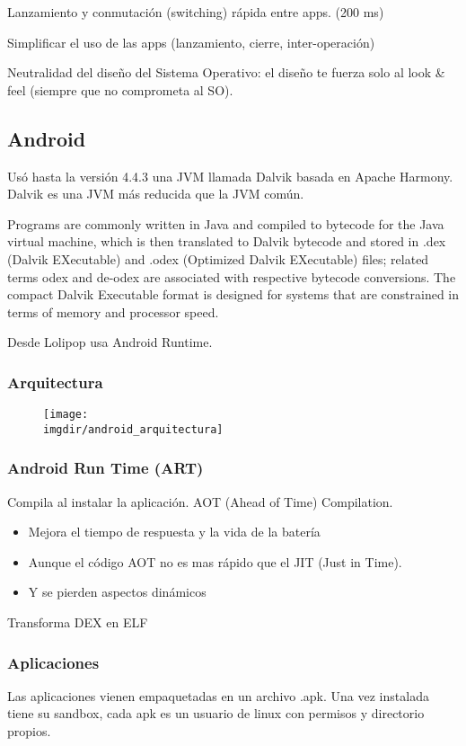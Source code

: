 \documentclass[a4paper, twoside]{article}
\newcommand{\imgdir}{../resources/images} %
\begin{document}
Lanzamiento y conmutación (switching) rápida entre apps. (200 ms)

Simplificar el uso de las apps (lanzamiento, cierre, inter-operación)

Neutralidad del diseño del Sistema Operativo: el diseño te fuerza solo al look \& feel (siempre que no comprometa al SO).

\subsection{Android}
Usó hasta la versión 4.4.3 una JVM llamada Dalvik basada en Apache Harmony. Dalvik es una JVM más reducida que la JVM común.

Programs are commonly written in Java and compiled to bytecode for the Java virtual machine, which is then translated to Dalvik bytecode and stored in .dex (Dalvik EXecutable) and .odex (Optimized Dalvik EXecutable) files; related terms odex and de-odex are associated with respective bytecode conversions. The compact Dalvik Executable format is designed for systems that are constrained in terms of memory and processor speed.

Desde Lolipop usa Android Runtime.

\subsubsection{Arquitectura}
\begin{figure}[h]
	\centering
	\texttt{[image: \\imgdir/android\_arquitectura]}
	\label{fig:android_arquitectura}
\end{figure}

\subsubsection{Android Run Time (ART)}
Compila al instalar la aplicación. AOT (Ahead of Time) Compilation.
\begin{itemize}
	\item Mejora el tiempo de respuesta y la vida de la batería
	\item Aunque el código AOT no es mas rápido que el JIT (Just in Time).
	\item Y se pierden aspectos dinámicos
\end{itemize}
Transforma DEX en ELF

\subsubsection{Aplicaciones}
Las aplicaciones vienen empaquetadas en un archivo .apk. Una vez instalada tiene su sandbox, cada apk es un usuario de linux con permisos y directorio propios.
\end{document}
